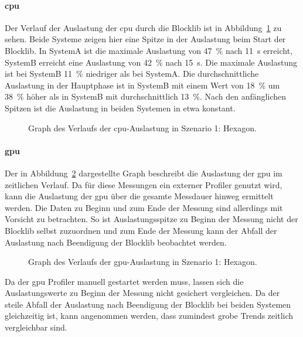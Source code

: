 \paragraph{\ac{cpu}} Der Verlauf der Auslastung der \ac{cpu} durch die Blocklib ist in Abbildung~\ref{fig:seed-0-hexagon-cpu} zu sehen. Beide Systeme zeigen hier eine Spitze in der Auslastung beim Start der Blocklib. In SystemA ist die maximale Auslastung von \SI{47}{\percent} nach \SI{11}{\second} erreicht, SystemB erreicht eine Auslastung von \SI{42}{\percent} nach \SI{15}{\second}. Die maximale Auslastung ist bei SystemB \SI{11}{\percent} niedriger als bei SystemA. Die durchschnittliche Auslastung in der Hauptphase ist in SystemB mit einem Wert von \SI{18}{\percent} um \SI{38}{\percent} höher als in SystemB mit durchschnittlich \SI{13}{\percent}. Nach den anfänglichen Spitzen ist die Auslastung in beiden Systemen in etwa konstant.
\begin{figure}[!htbp]
	\caption[Graph des Verlaufs der -Auslastung in Szenario 1: Hexagon.]{Graph des Verlaufs der \ac{cpu}-Auslastung in Szenario 1: Hexagon.}\label{fig:seed-0-hexagon-cpu}
\end{figure}


\paragraph{\ac{gpu}} Der in Abbildung~\ref{fig:seed-0-hexagon-gpu} dargestellte Graph beschreibt die Auslastung der \ac{gpu} im zeitlichen Verlauf. Da für diese Messungen ein externer Profiler genutzt wird, kann die Auslastung der \ac{gpu} über die gesamte Messdauer hinweg ermittelt werden. Die Daten zu Beginn und zum Ende der Messung sind allerdings mit Vorsicht zu betrachten. So ist Auslastungsspitze zu Beginn der Messung nicht der Blocklib selbst zuzuordnen und zum Ende der Messung kann der Abfall der Auslastung nach Beendigung der Blocklib beobachtet werden. 
\begin{figure}[!htbp]
	\caption[Graph des Verlaufs der -Auslastung in Szenario 1: Hexagon.]{Graph des Verlaufs der \ac{gpu}-Auslastung in Szenario 1: Hexagon.}\label{fig:seed-0-hexagon-gpu}
\end{figure}

Da der \ac{gpu} Profiler manuell gestartet werden muss, lassen sich die Auslastungswerte zu Beginn der Messung nicht gesichert vergleichen. Da der steile Abfall der Auslastung nach Beendigung der Blocklib bei beiden Systemen gleichzeitig ist, kann angenommen werden, dass zumindest grobe Trends zeitlich vergleichbar sind.

